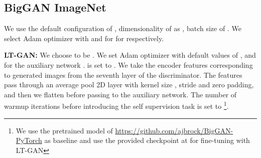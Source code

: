 \documentclass[10pt,twocolumn,letterpaper]{article}
\begin{document}
\subsection{BigGAN ImageNet}
We use the default configuration of , dimensionality of  as , batch size of . We select Adam optimizer with  and  for  for  respectively. 

\textbf{LT-GAN:}
We choose  to be . We set Adam optimizer with default values of ,  and  for the auxiliary network .  is set to . We take the encoder features  corresponding to generated images  from the seventh layer of the discriminator. The features  pass through an average pool 2D layer with kernel size , stride  and zero padding, and then we flatten before passing to the auxiliary network. The number of warmup iterations  before introducing the self supervision task is set to  \footnote{We use the pretrained model of \url{https://github.com/ajbrock/BigGAN-PyTorch} as baseline and use the provided checkpoint at  for fine-tuning with LT-GAN}.
\end{document}
